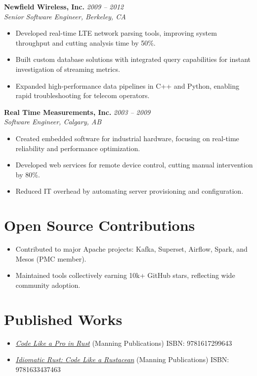 \documentclass[margin,line]{resume}
\begin{document}
\begin{resume}
\textbf{Newfield Wireless, Inc.} \hfill \textit{2009 -- 2012}\\
\textit{Senior Software Engineer, Berkeley, CA}
\begin{itemize}[leftmargin=0.5cm]
    \item Developed real-time LTE network parsing tools, improving system throughput and cutting analysis time by 50\%.
    \item Built custom database solutions with integrated query capabilities for instant investigation of streaming metrics.
    \item Expanded high-performance data pipelines in C++ and Python, enabling rapid troubleshooting for telecom operators.
\end{itemize}

\textbf{Real Time Measurements, Inc.} \hfill \textit{2003 -- 2009}\\
\textit{Software Engineer, Calgary, AB}
\begin{itemize}[leftmargin=0.5cm]
    \item Created embedded software for industrial hardware, focusing on real-time reliability and performance optimization.
    \item Developed web services for remote device control, cutting manual intervention by 80\%.
    \item Reduced IT overhead by automating server provisioning and configuration.
\end{itemize}

\vspace{10pt}

\section{Open Source Contributions}
\begin{itemize}[leftmargin=0.5cm]
    \item Contributed to major Apache projects: Kafka, Superset, Airflow, Spark, and Mesos (PMC member).
    \item Maintained tools collectively earning 10k+ GitHub stars, reflecting wide community adoption.
\end{itemize}

\vspace{10pt}

\section{Published Works}
\begin{itemize}[leftmargin=0.5cm]
    \item \href{https://www.manning.com/books/code-like-a-pro-in-rust}{\textit{Code Like a Pro in Rust}} (Manning Publications) \hfill ISBN: 9781617299643
    \item \href{https://www.manning.com/books/idiomatic-rust}{\textit{Idiomatic Rust: Code Like a Rustacean}} (Manning Publications) \hfill ISBN: 9781633437463
\end{itemize}


\end{resume}
\end{document}
